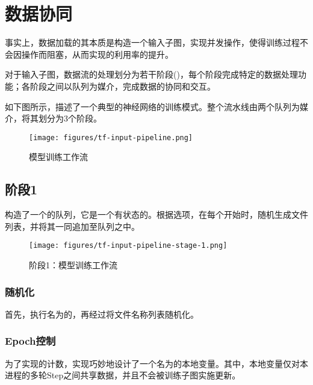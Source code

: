 \section{数据协同}

\begin{content}

事实上，数据加载的其本质是构造一个输入子图，实现并发操作，使得训练过程不会因操作而阻塞，从而实现的利用率的提升。

对于输入子图，数据流的处理划分为若干阶段()，每个阶段完成特定的数据处理功能；各阶段之间以队列为媒介，完成数据的协同和交互。

如下图所示，描述了一个典型的神经网络的训练模式。整个流水线由两个队列为媒介，将其划分为3个阶段。

\begin{figure}[!htbp]
\centering
\texttt{[image: figures/tf-input-pipeline.png]}
\caption{模型训练工作流}
 \label{fig:tf-input-pipeline}
\end{figure}

\subsection{阶段1}

构造了一个的队列，它是一个有状态的。根据选项，在每个开始时，随机生成文件列表，并将其一同追加至队列之中。

\begin{figure}[!htbp]
\centering
\texttt{[image: figures/tf-input-pipeline-stage-1.png]}
\caption{阶段1：模型训练工作流}
 \label{fig:tf-input-pipeline-stage-1}
\end{figure}

\subsubsection{随机化}

首先，执行名为的，再经过将文件名称列表随机化。

\subsubsection{Epoch控制}

为了实现的计数，实现巧妙地设计了一个名为的本地变量。其中，本地变量仅对本进程的多轮Step之间共享数据，并且不会被训练子图实施更新。


\end{content}
